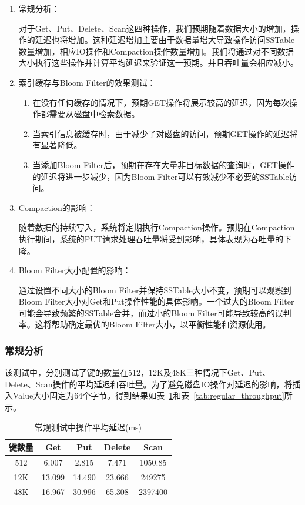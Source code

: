 \documentclass[fontset=windows]{article}
\begin{document}
\begin{enumerate}
    \item 常规分析：\par
    对于Get、Put、Delete、Scan这四种操作，我们预期随着数据大小的增加，操作的延迟也将增加。这种延迟增加主要由于数据量增大导致操作访问SSTable数量增加，相应IO操作和Compaction操作数量增加。我们将通过对不同数据大小执行这些操作并计算平均延迟来验证这一预期。并且吞吐量会相应减小。

    \item 索引缓存与Bloom Filter的效果测试：
    \begin{enumerate}
        \item 在没有任何缓存的情况下，预期GET操作将展示较高的延迟，因为每次操作都需要从磁盘中检索数据。
        \item 当索引信息被缓存时，由于减少了对磁盘的访问，预期GET操作的延迟将有显著降低。
        \item 当添加Bloom Filter后，预期在存在大量非目标数据的查询时，GET操作的延迟将进一步减少，因为Bloom Filter可以有效减少不必要的SSTable访问。
    \end{enumerate}

    \item Compaction的影响：\par
    随着数据的持续写入，系统将定期执行Compaction操作。预期在Compaction执行期间，系统的PUT请求处理吞吐量将受到影响，具体表现为吞吐量的下降。

    \item Bloom Filter大小配置的影响：\par
    通过设置不同大小的Bloom Filter并保持SSTable大小不变，预期可以观察到Bloom Filter大小对Get和Put操作性能的具体影响。一个过大的Bloom Filter可能会导致频繁的SSTable合并，而过小的Bloom Filter可能导致较高的误判率。这将帮助确定最优的Bloom Filter大小，以平衡性能和资源使用。
\end{enumerate}

\subsubsection{常规分析}
该测试中，分别测试了键的数量在512，12K及48K三种情况下Get、Put、Delete、Scan操作的平均延迟和吞吐量。为了避免磁盘IO操作对延迟的影响，将插入Value大小固定为64个字节。得到结果如表~\ref{tab:regular_latency}和表~\ref{tab:regular_throughput}所示。

\begin{table}[ht]
    \centering
    \begin{tabular}{ccccc}
        \toprule
        \textbf{键数量} & \textbf{Get} & \textbf{Put} & \textbf{Delete} & \textbf{Scan} \\
        \midrule
        512 & 6.007 & 2.815 & 7.471 & 1050.85 \\
        12K & 13.099 & 14.490 & 23.666 & 249275 \\
        48K & 16.967 & 30.996 & 65.308 & 2397400 \\
        \bottomrule
    \end{tabular}
    \caption{常规测试中操作平均延迟(ms)}
    \label{tab:regular_latency}
\end{table}
\end{document}
